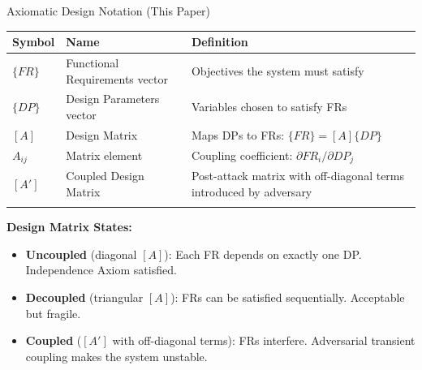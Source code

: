 \documentclass[
  ignorenonframetext,
]{beamer}
\newcounter{none} %
\providecommand{\tightlist}{%
  \setlength{\itemsep}{0pt}\setlength{\parskip}{0pt}}
\begin{document}
\begin{frame}[allowframebreaks]{Axiomatic Design Notation (This Paper)}
\protect{}\label{axiomatic-design-notation-this-paper}
{\def\LTcaptype{none} %
\begin{longtable}[]{@{}
  >{\raggedright\arraybackslash}p{}
  >{\raggedright\arraybackslash}p{}
  >{\raggedright\arraybackslash}p{}@{}}
\toprule\noalign{}
\begin{minipage}[b]{\linewidth}\raggedright
Symbol
\end{minipage} & \begin{minipage}[b]{\linewidth}\raggedright
Name
\end{minipage} & \begin{minipage}[b]{\linewidth}\raggedright
Definition
\end{minipage} \\
\midrule\noalign{}
\endhead
\(\{FR\}\) & Functional Requirements vector & Objectives the system must
satisfy \\
\(\{DP\}\) & Design Parameters vector & Variables chosen to satisfy
FRs \\
\([A]\) & Design Matrix & Maps DPs to FRs: \(\{FR\} = [A]\{DP\}\) \\
\(A_{ij}\) & Matrix element & Coupling coefficient:
\(\partial FR_i / \partial DP_j\) \\
\([A']\) & Coupled Design Matrix & Post-attack matrix with off-diagonal
terms introduced by adversary \\
\bottomrule\noalign{}
\end{longtable}
}

\textbf{Design Matrix States:}

\begin{itemize}
\tightlist
\item
  \textbf{Uncoupled} (diagonal \([A]\)): Each FR depends on exactly one
  DP. Independence Axiom satisfied.
\item
  \textbf{Decoupled} (triangular \([A]\)): FRs can be satisfied
  sequentially. Acceptable but fragile.
\item
  \textbf{Coupled} (\([A']\) with off-diagonal terms): FRs interfere.
  Adversarial transient coupling makes the system unstable.
\end{itemize}
\end{frame}
\end{document}
